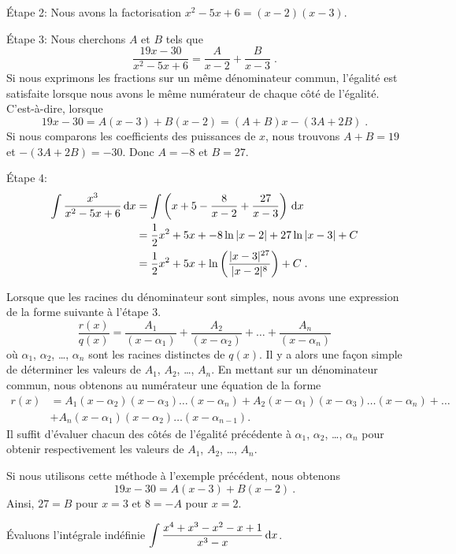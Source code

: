 {\begin{egg}
Étape 2: Nous avons la factorisation $x^2-5x+6 = (x-2)(x-3)$.

Étape 3: Nous cherchons $A$ et $B$ tels que
\[
\frac{19x-30}{x^2-5x+6} = \frac{A}{x-2} + \frac{B}{x-3} \; .
\]
Si nous exprimons les fractions sur un même dénominateur commun, l'égalité
est satisfaite lorsque nous avons le même numérateur de chaque côté de
l'égalité.  C'est-à-dire, lorsque
\[
19x -30 = A(x-3) + B(x-2) = (A+B)x - (3A+2B) \; .
\]
Si nous comparons les coefficients des puissances de $x$, nous trouvons
$A+B = 19$ et $-(3A+2B) = -30$.  Donc $A=-8$ et $B=27$.

Étape 4:
\begin{align*}
\int \frac{x^3}{x^2-5x+6}  \,\mathrm{d}x &=
\int \left( x + 5 - \frac{8}{x-2} + \frac{27}{x-3}\right) \,\mathrm{d}x \\
&= \frac{1}{2}x^2 + 5 x + -8 \ln|x-2| + 27 \ln|x-3| + C \\
&= \frac{1}{2}x^2 + 5x + \ln\left(\frac{|x-3|^{27}}{|x-2|^8}\right) + C \; .
\end{align*}
\end{egg}

\begin{rmk}
Lorsque que les racines du dénominateur sont simples, nous avons une
expression de la forme suivante à l'étape 3.
\[
\frac{r(x)}{q(x)} = \frac{A_1}{(x-\alpha_1)} + 
\frac{A_2}{(x-\alpha_2)} + \ldots + \frac{A_n}{(x-\alpha_n)}
\]
où  $\alpha_1$, $\alpha_2$, \ldots, $\alpha_n$ sont les racines
distinctes de $q(x)$.  Il y a alors une façon simple de déterminer les
valeurs de $A_1$, $A_2$, \ldots, $A_n$.  En mettant sur un dénominateur
commun, nous obtenons au numérateur une équation de la forme 
\begin{align*}
r(x) &= A_1(x-\alpha_2)(x-\alpha_3) \ldots (x-\alpha_n)
+ A_2(x-\alpha_1)(x-\alpha_3)\ldots(x-\alpha_n) + \ldots \\
&+ A_n(x-\alpha_1)(x-\alpha_2) \ldots (x-\alpha_{n-1})  .
\end{align*}
Il suffit d'évaluer chacun des côtés de l'égalité précédente à
$\alpha_1$, $\alpha_2$, \ldots , $\alpha_n$ pour obtenir
respectivement les valeurs de $A_1$, $A_2$, \ldots, $A_n$.

Si nous utilisons cette méthode à l'exemple précédent, nous obtenons
\[
19x -30 = A(x-3) + B(x-2) \ .
\]
Ainsi, $27=B$ pour $x=3$ et $8=-A$ pour $x=2$.
\end{rmk}

\begin{egg}
Évaluons l'intégrale indéfinie
$\displaystyle \int \frac{x^4+x^3-x^2-x+1}{x^3-x} \,\mathrm{d}x$.


\end{egg}}
